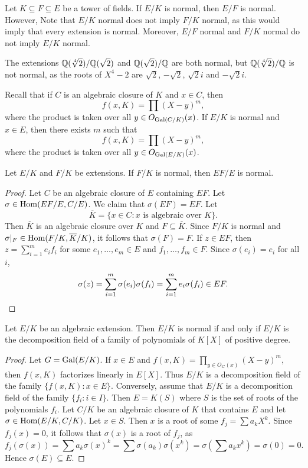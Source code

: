 Let $K\subseteq F\subseteq E$ be a tower of fields. 
If $E/K$ is normal, then $E/F$ is normal. However, 
Note that $E/K$ normal does not imply $F/K$ normal, as this would imply 
that every extension is normal. Moreover, 
$E/F$ normal and $F/K$ normal do not imply $E/K$ normal.
    
\begin{example}
The extensions $\mathbb{Q}(\sqrt[4]{2})/\mathbb{Q}(\sqrt{2})$ and $\mathbb{Q}(\sqrt{2})/\mathbb{Q}$ are both
normal, but $\mathbb{Q}(\sqrt[4]{2})/\mathbb{Q}$ is not normal, 
as the roots of $X^4-2$ are
$\sqrt{2}$, $-\sqrt{2}$, $\sqrt{2}i$ and $-\sqrt{2}i$.
\end{example}


Recall that if $C$ is an algebraic closure of $K$ and $x\in C$,
then 
\[
f(x,K)=\prod(X-y)^m,
\]
where the product is taken over all 
$y\in O_{\operatorname{Gal}(C/K)}(x)$. 
If $E/K$ is normal and $x\in E$, then there exists $m$ such that 
\[
f(x,K)=\prod(X-y)^m,
\]
where the product is taken over all 
$y\in O_{\operatorname{Gal}(E/K)}(x)$. 

\begin{proposition}
    Let $E/K$ and $F/K$ be extensions. If $F/K$ 
    is normal, then $EF/E$ is normal.
\end{proposition}

\begin{proof}
    Let $C$ be an algebraic closure of $E$ containing $EF$. 
    Let $\sigma\in\operatorname{Hom}(EF/E,C/E)$. We claim that $\sigma(EF)=EF$. Let 
    \[
    \overline{K}=\{x\in C:x\text{ is algebraic over $K$}\}.
    \]
    Then $\overline{K}$ is an algebraic closure over $K$ and $F\subseteq\overline{K}$. 
    Since $F/K$ is normal and $\sigma|_F\in\operatorname{Hom}(F/K,\overline{K}/K)$, 
    it follows that $\sigma(F)=F$. If $z\in EF$, then
    $z=\sum_{i=1}^m e_if_i$ for some $e_1,\dots,e_m\in E$ and 
    $f_1,\dots,f_m\in F$. Since $\sigma(e_i)=e_i$ for all $i$,  
    \[
    \sigma(z)=\sum_{i=1}^m\sigma(e_i)\sigma(f_i)=\sum_{i=1}^m e_i\sigma(f_i)\in EF.\qedhere 
    \]
\end{proof}

\begin{proposition}
    Let $E/K$ be an algebraic extension. Then 
    $E/K$ is normal if and only if $E/K$ is the decomposition field
    of a family of polynomials of $K[X]$ of positive degree.
\end{proposition}

\begin{proof}
    Let $G=\operatorname{Gal}(E/K)$. If $x\in E$ and $f(x,K)=\prod_{y\in O_G(x)}(X-y)^m$, 
    then $f(x,K)$ factorizes linearly in $E[X]$. Thus 
    $E/K$ is a decomposition field of the family 
    $\{f(x,K):x\in E\}$. 
    Conversely, assume that $E/K$ is a decomposition field of the family 
    $\{f_i:i\in I\}$. Then $E=K(S)$ where $S$ is the set of roots
    of the polynomials $f_i$. Let $C/K$ be an algebraic closure
    of $K$ that contains $E$ and let $\sigma\in\operatorname{Hom}(E/K,C/K)$. Let $x\in S$. 
    Then $x$ is a root of some $f_j=\sum a_kX^k$. Since $f_j(x)=0$, 
    it follows that $\sigma(x)$ is a root of $f_j$, as 
    \[
    f_j(\sigma(x))=\sum a_k\sigma(x)^k
    =\sum\sigma(a_k)\sigma(x^k)
    =\sigma\left(\sum a_kx^k\right)=\sigma(0)=0.
    \]
    Hence $\sigma(E)\subseteq E$. 
\end{proof}

